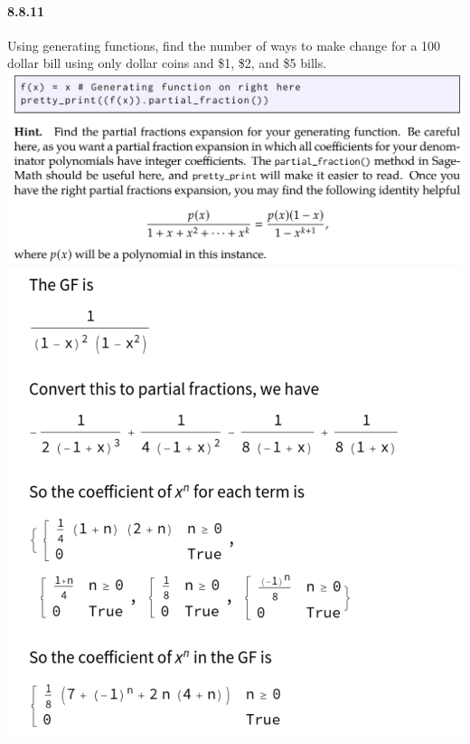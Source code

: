 \documentclass{article}
\begin{document}
\paragraph{8.8.11}
Using generating functions, find the number of ways to make change for a 100
dollar bill using only dollar coins and \$1, \$2, and \$5 bills. \newline
\includegraphics{0014}\newline
\includegraphics{0018}
\end{document}
